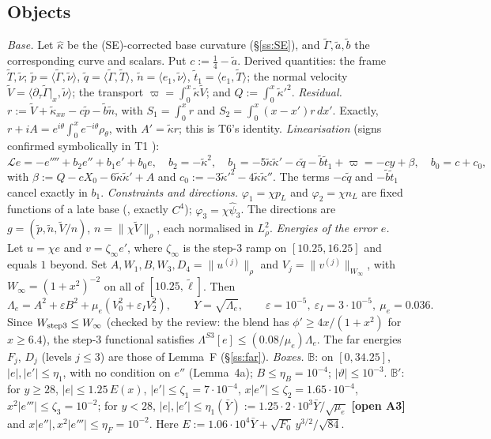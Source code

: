 \documentclass[11pt]{article}
\theoremstyle{definition}
\theoremstyle{remark}
\newcommand{\fn}[1]{\texttt{\detokenize{#1}}}
\newcommand{\OPEN}[1]{\textcolor{red!75!black}{\textbf{\textsf{[open #1]}}}}
\newcommand{\ip}[2]{\langle #1,#2\rangle}
\newcommand{\abs}[1]{\lvert #1\rvert}
\newcommand{\norm}[1]{\lVert #1\rVert}
\newcommand{\kt}{\tilde\kappa}
\newcommand{\Gt}{\tilde\Gamma}
\newcommand{\lt}{\tilde\ell}
\newcommand{\Yb}{\bar Y}
\newcommand{\eps}{\varepsilon}
\newcommand{\cL}{\mathcal L}
\newcommand{\Lam}{\Lambda}
\begin{document}
\subsection{Objects}\label{ss:objects}
\emph{Base.} Let $\hat\kappa$ be the (SE)-corrected base curvature (\S\ref{ss:SE}), and $\Gt,\tilde a,\tilde b$ the corresponding curve and scalars. Put $c:=\frac14-\tilde a$. Derived quantities: the frame $\tilde T,\tilde\nu$; $\tilde p=\ip\Gt{\tilde\nu}$, $\tilde q=\ip\Gt{\tilde T}$, $\tilde n=\ip{e_1}{\tilde\nu}$, $\tilde t_1=\ip{e_1}{\tilde T}$; the normal velocity $\tilde V=\ip{\partial_\tau\Gt|_x}{\tilde\nu}$; the transport $\varpi=\int_0^x\kt\tilde V$; and $Q:=\int_0^x\kt'^2$.
\emph{Residual.} $r:=\tilde V+\kt_{xx}-c\tilde p-\tilde b\tilde n$, with $S_1=\int_0^xr$ and $S_2=\int_0^x(x-x')r\,dx'$. Exactly, $r+iA=e^{i\theta}\int_0^xe^{-i\theta}\rho_\theta$, with $A'=\kt r$; this is T6's identity.
\emph{Linearisation} (signs confirmed symbolically in T1 \fn{signs.py}):
\[
\cL e=-e''''+b_2e''+b_1e'+b_0e,\quad b_2=-\kt^2,\quad b_1=-5\kt\kt'-c\tilde q-\tilde b\tilde t_1+\varpi=-cy+\beta,\quad b_0=c+c_0,
\]
with $\beta:=Q-cX_0-6\kt\kt'+A$ and $c_0:=-3\kt'^2-4\kt\kt''$. The terms $-c\tilde q$ and $-\tilde b\tilde t_1$ cancel exactly in $b_1$.
\emph{Constraints and directions.} $\varphi_1=\chi p_L$ and $\varphi_2=\chi n_L$ are fixed functions of a late base (\fn{t7/phi_store.json}, exactly $C^4$); $\varphi_3=\chi\hat\psi_3$. The directions are $g=(\tilde p,\tilde n,\tilde V/n)$, $n=\norm{\chi\tilde V}_\rho$, each normalised in $L^2_\rho$.
\emph{Energies of the error $e$.} Let $u=\chi e$ and $v=\zeta_\infty e'$, where $\zeta_\infty$ is the step-3 ramp on $[10.25,16.25]$ and equals $1$ beyond. Set $A,W_1,B,W_3,D_4=\norm{u^{(j)}}_\rho$ and $V_j=\norm{v^{(j)}}_{W_\infty}$, with $W_\infty=(1+x^2)^{-2}$ on all of $[10.25,\lt]$. Then
\[
\Lam_e=A^2+\eps B^2+\mu_e(V_0^2+\eps_IV_2^2),\qquad Y=\sqrt{\Lam_e},\qquad\eps=10^{-5},\ \eps_I=3\cdot10^{-5},\ \mu_e=0.036 .
\]
Since $W_{\rm step3}\le W_\infty$ (checked by the review: the blend has $\phi'\ge4x/(1+x^2)$ for $x\ge6.4$), the step-3 functional satisfies $\Lam^{S3}[e]\le(0.08/\mu_e)\Lam_e$. The far energies $F_j$, $D_j$ (levels $j\le3$) are those of Lemma~F (\S\ref{ss:far}).
\emph{Boxes.} $\mathbb B$: on $[0,34.25]$, $\abs e,\abs{e'}\le\eta_1$, with no condition on $e''$ (Lemma~4a); $B\le\eta_B=10^{-4}$; $\abs\vartheta\le10^{-3}$. $\mathbb B'$: for $y\ge28$, $\abs e\le1.25\,E(x)$, $\abs{e'}\le\zeta_1=7\cdot10^{-4}$, $x\abs{e''}\le\zeta_2=1.65\cdot10^{-4}$, $x^2\abs{e'''}\le\zeta_3=10^{-2}$; for $y<28$, $\abs e,\abs{e'}\le\eta_1(\Yb):=1.25\cdot2\cdot10^3\Yb/\sqrt{\mu_e}$ \OPEN{A3} and $x\abs{e''},x^2\abs{e'''}\le\eta_F=10^{-2}$. Here $E:=1.06\cdot10^4\Yb+\sqrt{F_0}\,y^{3/2}/\sqrt{84}$.
\end{document}
